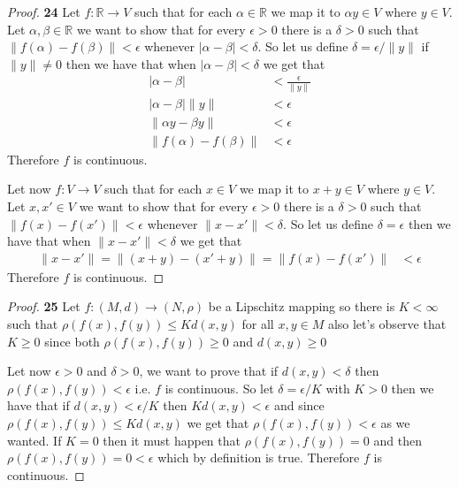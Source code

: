 \documentclass[11pt]{article}
\newcommand{\R}{\mathbb{R}}
\theoremstyle{definition}
\begin{document}
    \begin{proof}{\textbf{24}}
        Let $f:\R \to V$ such that for each $\alpha \in \R$ we map it to
        $\alpha y \in V$ where $y \in V$. Let $\alpha, \beta \in \R$ we want to
        show that for every $\epsilon > 0$ there is a $\delta > 0$ such that 
        $\|f(\alpha) - f(\beta)\| < \epsilon$ whenever
        $|\alpha - \beta| < \delta$. So let us define $\delta = \epsilon/\|y\|$
        if $\|y\| \neq 0$ then we have that when $|\alpha - \beta| < \delta$ we
        get that
        \begin{align*}
            |\alpha - \beta| &< \frac{\epsilon}{\|y\|}\\
            |\alpha - \beta|\|y\| &< \epsilon\\
            \|\alpha y - \beta y\| &< \epsilon\\
            \|f(\alpha) - f(\beta)\| &< \epsilon
        \end{align*}
        Therefore $f$ is continuous.

        Let now $f:V \to V$ such that for each $x \in V$ we map it to
        $x + y \in V$ where $y \in V$. Let $x, x' \in V$ we want to show that
        for every $\epsilon > 0$ there is a $\delta > 0$ such that
        $\|f(x)-f(x')\|< \epsilon$ whenever $\|x - x'\|<\delta$. So let us
        define $\delta = \epsilon$ then we have that when $\|x - x'\|<\delta$
        we get that
        \begin{align*}
            \|x - x'\| = \|(x+y) - (x'+y)\| =\|f(x) - f(x')\| &< \epsilon
        \end{align*}
        Therefore $f$ is continuous.
    \end{proof}
    \begin{proof}{\textbf{25}}
        Let $f:(M,d) \to (N,\rho)$ be a Lipschitz mapping so there is
        $K < \infty$ such that $\rho(f(x), f(y)) \leq Kd(x,y)$ for all
        $x,y \in M$ also let's observe that $K \geq 0$ since both
        $\rho(f(x), f(y)) \geq 0$ and $d(x,y) \geq 0$
        
        Let now $\epsilon > 0$ and $\delta > 0$, we want to prove that if
        $d(x,y) < \delta$ then $\rho(f(x),f(y)) < \epsilon$ i.e. $f$ is
        continuous. So let $\delta = \epsilon / K$ with $K > 0$ then we have
        that if $d(x,y) < \epsilon/K$ then $K d(x,y) < \epsilon$ and since 
        $\rho(f(x),f(y)) \leq K d(x,y)$ we get that
        $\rho(f(x), f(y)) < \epsilon$ as we wanted.
        If $K = 0$ then it must happen that $\rho(f(x), f(y)) = 0$ and
        then $\rho(f(x), f(y)) = 0 < \epsilon$ which by definition is true.
        Therefore $f$ is continuous.
    \end{proof}
\end{document}
